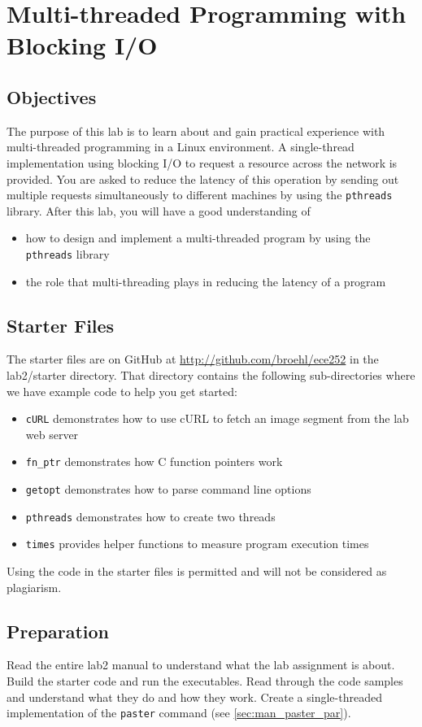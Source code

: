 \chapter{Multi-threaded Programming with Blocking I/O}
\label{ch2_pthreads}

\section{Objectives}
The purpose of this lab is to learn about and gain practical experience with multi-threaded programming in a Linux environment. A single-thread implementation using blocking I/O to request a resource across the network is provided. You are asked to reduce the latency of this operation by sending out multiple requests simultaneously to different machines by using the \verb+pthreads+ library. After this lab, you will have a good understanding of
\begin{itemize}
  \item  how to design and implement a multi-threaded program by using the \verb+pthreads+ library
  \item  the role that multi-threading plays in reducing the latency of a program
\end{itemize}

\section{Starter Files}
The starter files are on GitHub at \url{http://github.com/broehl/ece252} in the lab2/starter directory.
That directory contains the following sub-directories where we have example code to help you get started:
\begin{itemize}
    \item \verb+cURL+ demonstrates how to use cURL to fetch an image segment from the lab web server
    \item \verb+fn_ptr+ demonstrates how C function pointers work
    \item \verb+getopt+ demonstrates how to parse command line options
    \item \verb+pthreads+ demonstrates how to create two threads
    \item \verb+times+ provides helper functions to measure program execution times
\end{itemize}
Using the code in the starter files is permitted and will not be considered as plagiarism.

\section{Preparation}
Read the entire lab2 manual to understand what the lab assignment is about. Build the starter code and run the executables. Read through the code samples and understand what they do and how they work. Create a single-threaded implementation of the \verb+paster+ command (see \ref{sec:man_paster_par}).

